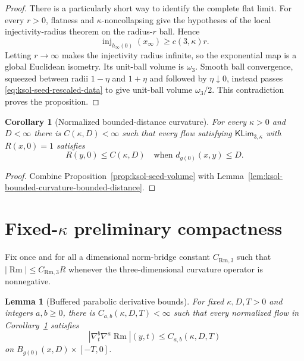 \documentclass[10pt]{coll-l}
\newcommand{\inj}{\operatorname{inj}}
\newtheorem{corollary}[theorem]{Corollary}
\newtheorem{lemma}[theorem]{Lemma}
\theoremstyle{definition}
\theoremstyle{remark}
\numberwithin{section}{chapter}
\numberwithin{equation}{chapter}
\newcommand{\Rm}{\operatorname{Rm}}
\begin{document}
\begin{proof}
There is a particularly short way to identify the complete flat limit.
For every $r>0$, flatness and $\kappa$-noncollapsing give the hypotheses of
the local injectivity-radius theorem on the radius-$r$ ball.  Hence
\begin{equation}
                    \inj_{h_\infty(0)}(x_\infty)
                          \geq c(3,\kappa)r.
\end{equation}
Letting $r\to\infty$ makes the injectivity radius infinite, so the
exponential map is a global Euclidean isometry.  Its unit-ball volume is
$\omega_3$.  Smooth ball convergence, squeezed between radii
$1-\eta$ and $1+\eta$ and followed by $\eta\downarrow0$, instead passes
\eqref{eq:ksol-seed-rescaled-data} to give unit-ball volume $\omega_3/2$.
This contradiction proves the proposition.
\end{proof}

\begin{corollary}[Normalized bounded-distance curvature]
\label{cor:ksol-normalized-bounded-distance}
For every $\kappa>0$ and $D<\infty$ there is $C(\kappa,D)<\infty$ such
that every flow satisfying $\mathsf{KLim}_{3,\kappa}$ with $R(x,0)=1$
satisfies
\begin{equation}
                   R(y,0)\leq C(\kappa,D)
       \quad\text{when }d_{g(0)}(x,y)\leq D.           \label{eq:ksol-normalized-local-R}
\end{equation}
\end{corollary}

\begin{proof}
Combine Proposition~\ref{prop:ksol-seed-volume} with
Lemma~\ref{lem:ksol-bounded-curvature-bounded-distance}.
\end{proof}

\section{Fixed-$\kappa$ preliminary compactness}
\label{sec:ksol-fixed-compactness}

Fix once and for all a dimensional norm-bridge constant
$C_{\mathrm{Rm},3}$ such that $|\Rm|\leq C_{\mathrm{Rm},3}R$ whenever the
three-dimensional curvature operator is nonnegative.

\begin{lemma}[Buffered parabolic derivative bounds]
\label{lem:ksol-buffered-parabolic-bounds}
For fixed $\kappa,D,T>0$ and integers $a,b\geq0$, there is
$C_{a,b}(\kappa,D,T)<\infty$ such that every normalized flow in
Corollary~\ref{cor:ksol-normalized-bounded-distance} satisfies
\begin{equation}
 |\nabla_t^b\nabla^a\Rm|(y,t)\leq C_{a,b}(\kappa,D,T)  \label{eq:ksol-buffered-derivative-bound}
\end{equation}
on $B_{g(0)}(x,D)\times[-T,0]$.
\end{lemma}
\end{document}
